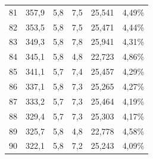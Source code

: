 \begin{longtable}{cccccc}
  81          & 357,9                & 5,8           & 7,5            & 25,541        & 4,49\%                             \\
  82          & 353,5                & 5,8           & 7,5            & 25,471        & 4,44\%                             \\
  83          & 349,3                & 5,8           & 7,8            & 25,941        & 4,31\%                             \\
  84          & 345,1                & 5,8           & 4,8            & 22,723        & 4,86\%                             \\
  85          & 341,1                & 5,7           & 7,4            & 25,457        & 4,29\%                             \\
  86          & 337,1                & 5,8           & 7,3            & 25,265        & 4,27\%                             \\
  87          & 333,2                & 5,7           & 7,3            & 25,464        & 4,19\%                             \\
  88          & 329,4                & 5,7           & 7,3            & 25,303        & 4,17\%                             \\
  89          & 325,7                & 5,8           & 4,8            & 22,778        & 4,58\%                             \\
  90          & 322,1                & 5,8           & 7,2            & 25,243        & 4,09\%                             \\
\end{longtable}